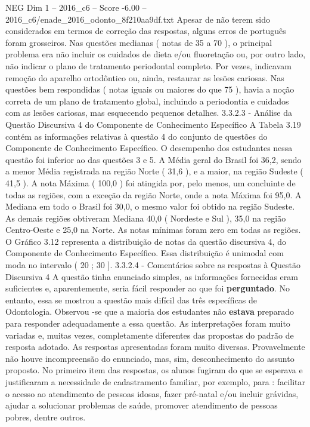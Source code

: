 \begin{textsample}{NEG Dim 1 – 2016\_c6 – Score -6.00 – 2016\_c6/enade\_2016\_odonto\_8f210aa9df.txt}
Apesar de não terem sido considerados em termos de correção das respostas, alguns erros de português foram grosseiros.
Nas questões medianas ( notas de 35 a 70 ), o principal problema era não incluir os cuidados de dieta e/ou fluoretação ou, por outro lado, não indicar o plano de tratamento periodontal completo.
Por vezes, indicavam remoção do aparelho ortodôntico ou, ainda, restaurar as lesões cariosas.
Nas questões bem respondidas ( notas iguais ou maiores do que 75 ), havia a noção correta de um plano de tratamento global, incluindo a periodontia e cuidados com as lesões cariosas, mas esquecendo pequenos detalhes. 3.3.2.3 - Análise da Questão Discursiva 4 do Componente de Conhecimento Específico A Tabela 3.19 contém as informações relativas à questão 4 do conjunto de questões do Componente de Conhecimento Específico.
O desempenho dos estudantes nessa questão foi inferior ao das questões 3 e 5.
A Média geral do Brasil foi 36,2, sendo a menor Média registrada na região Norte ( 31,6 ), e a maior, na região Sudeste ( 41,5 ).
A nota Máxima ( 100,0 ) foi atingida por, pelo menos, um concluinte de todas as regiões, com a exceção da região Norte, onde a nota Máxima foi 95,0.
A Mediana em todo o Brasil foi 30,0, o mesmo valor foi obtido na região Sudeste.
As demais regiões obtiveram Mediana 40,0 ( Nordeste e Sul ), 35,0 na região Centro-Oeste e 25,0 na Norte.
As notas mínimas foram zero em todas as regiões.
O Gráfico 3.12 representa a distribuição de notas da questão discursiva 4, do Componente de Conhecimento Específico.
Essa distribuição é unimodal com moda no intervalo ( 20 ; 30 ]. 3.3.2.4 - Comentários sobre as respostas à Questão Discursiva 4 A questão tinha enunciado simples, as informações fornecidas eram suficientes e, aparentemente, seria fácil responder ao que foi \textbf{perguntado}.
No entanto, essa se mostrou a questão mais difícil das três específicas de Odontologia.
Observou -se que a maioria dos estudantes não \textbf{estava} preparado para responder adequadamente a essa questão.
As interpretações foram muito variadas e, muitas vezes, completamente diferentes das propostas do padrão de resposta adotado.
As respostas apresentadas foram muito diversas.
Provavelmente não houve incompreensão do enunciado, mas, sim, desconhecimento do assunto proposto.
No primeiro item das respostas, os alunos fugiram do que se esperava e justificaram a necessidade de cadastramento familiar, por exemplo, para : facilitar o acesso ao atendimento de pessoas idosas, fazer pré-natal e/ou incluir grávidas, ajudar a solucionar problemas de saúde, promover atendimento de pessoas pobres, dentre outros.

\end{textsample}

